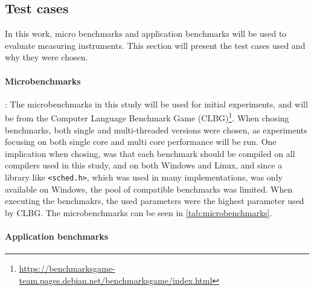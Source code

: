 \subsection{Test cases}\label{subsec:test_cases}

In this work, micro benchmarks and application benchmarks will be used to evaluate measuring instruments. This section will present the test cases used and why they were chosen.

\paragraph{Microbenchmarks}: The microbenchmarks in this study will be used for initial experiments, and will be from the Computer Language Benchmark Game (CLBG)\footnote{\url{https://benchmarksgame-team.pages.debian.net/benchmarksgame/index.html}}. When chosing benchmarks, both single and multi-threaded versions were chosen, as experiments focusing on both single core and multi core performance will be run. One implication when chosing, was that each benchmark should be compiled on all compilers used in this study, and on both Windows and Linux, and since a library like \texttt{<sched.h>}, which was used in many implementations, was only available on Windows, the pool of compatible benchmarks was limited. When executing the benchmakrs, the used parameters were the highest parameter used by CLBG. The microbenchmarks can be seen in \cref{tab:microbenchmarks}.



\paragraph{Application benchmarks}
